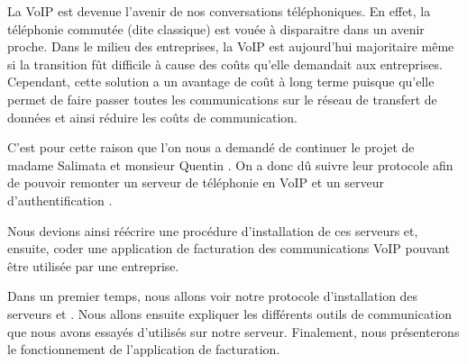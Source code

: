 
La VoIP est devenue l'avenir de nos conversations téléphoniques. En effet, la téléphonie commutée (dite classique) est vouée à disparaitre dans un avenir proche. Dans le milieu des entreprises, la VoIP est aujourd'hui majoritaire même si la transition fût difficile à cause des coûts qu'elle demandait aux entreprises. Cependant, cette solution a un avantage de coût à long terme puisque qu'elle permet de faire passer toutes les communications sur le réseau de transfert de données et ainsi réduire les coûts de communication.

C'est pour cette raison que l'on nous a demandé de continuer le projet de madame Salimata  et monsieur Quentin . On a donc dû suivre leur protocole afin de pouvoir remonter un serveur de téléphonie en VoIP {\kam} et un serveur d'authentification {\rad}.

Nous devions ainsi réécrire une procédure d'installation de ces serveurs et, ensuite, coder une application de facturation des communications VoIP pouvant être utilisée par une entreprise.

Dans un premier temps, nous allons voir notre protocole d'installation des serveurs {\kam} et {\frad}. Nous allons ensuite expliquer les différents outils de communication que nous avons essayés d'utilisés sur notre serveur. Finalement, nous présenterons le fonctionnement de l'application de facturation.